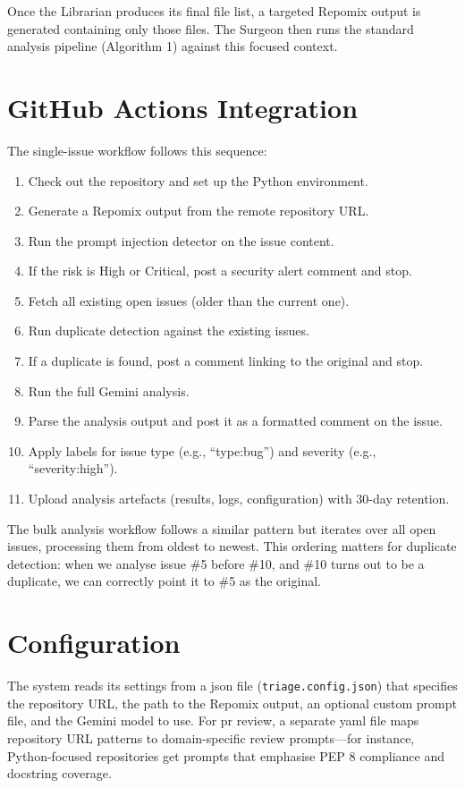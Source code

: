 Once the Librarian produces its final file list, a targeted Repomix output is generated containing only those files. The Surgeon then runs the standard analysis pipeline (Algorithm 1) against this focused context.

\section{GitHub Actions Integration}

The single-issue workflow follows this sequence:

\begin{enumerate}
\item Check out the repository and set up the Python environment.
\item Generate a Repomix output from the remote repository URL.
\item Run the prompt injection detector on the issue content.
\item If the risk is High or Critical, post a security alert comment and stop.
\item Fetch all existing open issues (older than the current one).
\item Run duplicate detection against the existing issues.
\item If a duplicate is found, post a comment linking to the original and stop.
\item Run the full Gemini analysis.
\item Parse the analysis output and post it as a formatted comment on the issue.
\item Apply labels for issue type (e.g., ``type:bug'') and severity (e.g., ``severity:high'').
\item Upload analysis artefacts (results, logs, configuration) with 30-day retention.
\end{enumerate}

The bulk analysis workflow follows a similar pattern but iterates over all open issues, processing them from oldest to newest. This ordering matters for duplicate detection: when we analyse issue \#5 before \#10, and \#10 turns out to be a duplicate, we can correctly point it to \#5 as the original.

\section{Configuration}

The system reads its settings from a \gls{json} file (\texttt{triage.config.json}) that specifies the repository URL, the path to the Repomix output, an optional custom prompt file, and the Gemini model to use. For \gls{pr} review, a separate \gls{yaml} file maps repository URL patterns to domain-specific review prompts---for instance, Python-focused repositories get prompts that emphasise PEP 8 compliance and docstring coverage.

